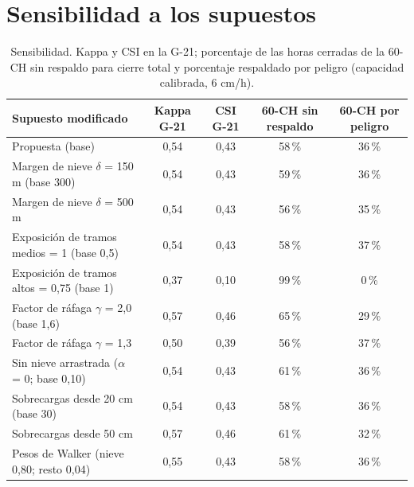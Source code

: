 \section{Sensibilidad a los supuestos}\label{sec:sensibilidad}


\begin{table}[H]
\centering\footnotesize\setlength{\tabcolsep}{4pt}
\caption{Sensibilidad. Kappa y CSI en la G-21; porcentaje de las horas cerradas de la 60-CH sin respaldo para cierre total y porcentaje respaldado por peligro (capacidad calibrada, 6 cm/h).}
\label{tab:sensibilidad}
\begin{tabular}{|l|c|c|c|c|}
\hline
Supuesto modificado & Kappa G-21 & CSI G-21 & 60-CH sin respaldo & 60-CH por peligro \\ \hline
Propuesta (base) & 0,54 & 0,43 & 58\,\% & 36\,\% \\ \hline
Margen de nieve $\delta$ = 150 m (base 300) & 0,54 & 0,43 & 59\,\% & 36\,\% \\ \hline
Margen de nieve $\delta$ = 500 m & 0,54 & 0,43 & 56\,\% & 35\,\% \\ \hline
Exposición de tramos medios = 1 (base 0,5) & 0,54 & 0,43 & 58\,\% & 37\,\% \\ \hline
Exposición de tramos altos = 0,75 (base 1) & 0,37 & 0,10 & 99\,\% & 0\,\% \\ \hline
Factor de ráfaga $\gamma$ = 2,0 (base 1,6) & 0,57 & 0,46 & 65\,\% & 29\,\% \\ \hline
Factor de ráfaga $\gamma$ = 1,3 & 0,50 & 0,39 & 56\,\% & 37\,\% \\ \hline
Sin nieve arrastrada ($\alpha$ = 0; base 0,10) & 0,54 & 0,43 & 61\,\% & 36\,\% \\ \hline
Sobrecargas desde 20 cm (base 30) & 0,54 & 0,43 & 58\,\% & 36\,\% \\ \hline
Sobrecargas desde 50 cm & 0,57 & 0,46 & 61\,\% & 32\,\% \\ \hline
Pesos de Walker (nieve 0,80; resto 0,04) & 0,55 & 0,43 & 58\,\% & 36\,\% \\ \hline
\end{tabular}
\end{table}

